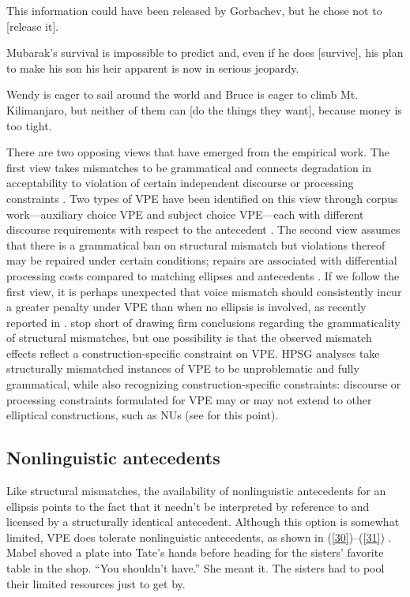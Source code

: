 \documentclass[output=paper
                ,modfonts
                ,nonflat
	        ,collection
	        ,collectionchapter
	        ,collectiontoclongg
 	        ,biblatex
                ,babelshorthands
                ,newtxmath
                ,draftmode
                ,colorlinks, citecolor=brown
]{./langsci/langscibook}
\begin{document}
{\ea This information could have been released by Gorbachev, but he chose not to [release it]. \citep[37]{Hardt1993} \label{27}\z

\ea Mubarak's survival is impossible to predict and, even if he does [survive], his plan to make his son his heir apparent is now in serious jeopardy. \citep{Miller2014a} \label{28}\z

\ea Wendy is eager to sail around the world and Bruce is eager to climb Mt. Kilimanjaro, but neither of them can [do the things they want], because money is too tight. \citep{Webber79a} \label{29}\z

There are two opposing views that have emerged from the empirical work. The first view takes mismatches to be grammatical and connects degradation in acceptability to violation of certain independent discourse \citep{Kehler2002, Miller2011, Kertz2013, Miller2014a, Miller2014b} or processing constraints \citep{Kim2011}. Two types of VPE have been identified on this view through corpus work---auxiliary choice VPE and subject choice VPE---each with different discourse requirements with respect to the antecedent \citep{Miller2011, Miller2014a, Miller2014b}. The second view assumes that there is a grammatical ban on structural mismatch but violations thereof may be repaired under certain conditions; repairs are associated with differential processing costs compared to matching ellipses and antecedents \citep{Arregui2006, Grant2012}. If we follow the first view, it is perhaps unexpected that voice mismatch should consistently incur a greater penalty under VPE than when no ellipsis is involved, as recently reported in \citet{Kim2017}. \citet{Kim2017} stop short of drawing firm conclusions regarding the grammaticality of structural mismatches, but one possibility is that the observed mismatch effects reflect a construction-specific constraint on VPE. HPSG analyses take structurally mismatched instances of VPE to be unproblematic and fully grammatical, while also recognizing construction-specific constraints: discourse or processing constraints formulated for VPE may or may not extend to other elliptical constructions, such as NUs (see \citealt{Ginzburg2018} for this point).


\subsection{Nonlinguistic antecedents}
Like structural mismatches, the availability of nonlinguistic antecedents for an ellipsis points to the fact that it needn't be interpreted by reference to and licensed by a structurally identical antecedent. Although this option is somewhat limited, VPE does tolerate nonlinguistic antecedents, as shown in (\ref{30})--(\ref{31}) \citep[see also][]{Hankamer1976, Schachter1977}.
\ea Mabel shoved a plate into Tate's hands before heading for the sisters' favorite table in the shop. ``You shouldn't have.'' She meant it. The sisters had to pool their limited resources
just to get by. \citep[ex. 23][]{Miller2014b}\label{30}\z

}
\end{document}
